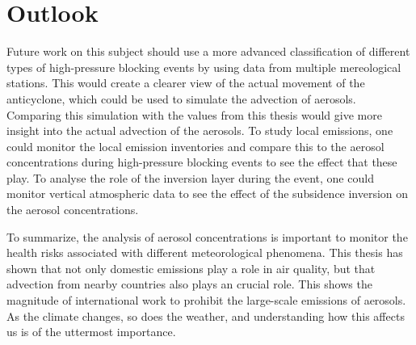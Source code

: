 \section{Outlook}
Future work on this subject should use a more advanced classification of different types of high-pressure blocking events by using data from multiple mereological stations. This would create a clearer view of the actual movement of the anticyclone, which could be used to simulate the advection of aerosols. Comparing this simulation with the values from this thesis would give more insight into the actual advection of the aerosols. To study local emissions, one could monitor the local emission inventories and compare this to the aerosol concentrations during high-pressure blocking events to see the effect that these play. To analyse the role of the inversion layer during the event, one could monitor vertical atmospheric data to see the effect of the subsidence inversion on the aerosol concentrations.

To summarize, the analysis of aerosol concentrations is important to monitor the health risks associated with different meteorological phenomena. This thesis has shown that not only domestic emissions play a role in air quality, but that advection from nearby countries also plays an crucial role. This shows the magnitude of international work to prohibit the large-scale emissions of aerosols. As the climate changes, so does the weather, and understanding how this affects us is of the uttermost importance.

